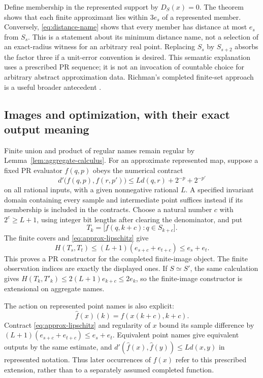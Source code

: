 Define membership in the represented support by $D_S(x)=0$. The theorem
shows that each finite approximant lies within $3e_s$ of a represented
member. Conversely, \eqref{eq:distance-name} shows that every member has
distance at most $e_s$ from $S_s$. This is a statement about its minimum
distance name, not a selection of an exact-radius witness for an arbitrary
real point. Replacing $S_s$ by $S_{s+2}$ absorbs the factor
three if a unit-error convention is desired. This semantic explanation
uses a prescribed PR sequence; it is not an invocation of countable
choice for arbitrary abstract approximation data. Richman's completed
finite-set approach is a useful broader antecedent \cite{richman2000}.

\subsection{Images and optimization, with their exact output meaning}

Finite union and product of regular names remain regular by
Lemma~\ref{lem:aggregate-calculus}. For an approximate represented map,
suppose a fixed PR evaluator $f(q,p)$ obeys the numerical contract
\[
 d'\bigl(f(q,p),f(r,p')\bigr)
          \le Ld(q,r)+2^{-p}+2^{-p'}              \tag{L}\label{eq:approx-lipschitz}
\]
on all rational inputs, with a given nonnegative rational $L$.
A specified invariant domain containing every sample and intermediate
point suffices instead if its membership is included in the contracts.
Choose a natural number $c$ with $2^c\ge L+1$, using integer bit lengths
after clearing the denominator, and put
\[
                  T_k=\bigl[f(q,k+c):q\in S_{k+c}\bigr].
\]
The finite covers and \eqref{eq:approx-lipschitz} give
\[
 H(T_s,T_t)\le(L+1)(e_{s+c}+e_{t+c})\le e_s+e_t.
\]
This proves a PR constructor for the completed finite-image object.
The finite observation indices are exactly the displayed ones. If $S\simeq S'$, the same calculation gives $H(T_k,T'_k)\le2(L+1)e_{k+c}\le2e_k$, so the finite-image constructor is extensional on aggregate names.

The action on represented point names is also explicit:
\[
             \widehat f(x)(k)=f(x(k+c),k+c).
\]
Contract \eqref{eq:approx-lipschitz} and regularity of $x$ bound its
sample difference by $(L+1)(e_{s+c}+e_{t+c})\le e_s+e_t$.
Equivalent point names give equivalent outputs by the same estimate,
and $d'(\widehat f(x),\widehat f(y))\le Ld(x,y)$ in represented
notation. Thus later occurrences of $f(x)$ refer to this prescribed
extension, rather than to a separately assumed completed function.

